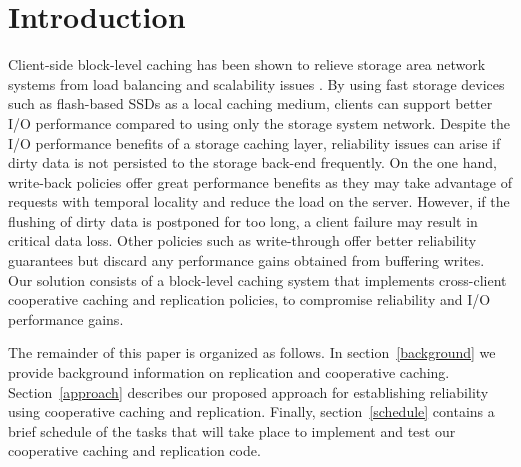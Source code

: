 \section{Introduction}

Client-side block-level caching has been shown to relieve storage
area network systems from load balancing and scalability issues
\cite{DM-Cache}\cite{visa-dm-cache}. By using fast storage devices
such as flash-based SSDs as a local caching medium, clients
can support better I/O performance compared to using only the
storage system network. Despite the I/O performance benefits of a
storage caching layer, reliability issues can arise if dirty data
is not persisted to the storage back-end frequently. On the one
hand, write-back policies offer great performance benefits as they
may take advantage of requests with temporal locality and reduce
the load on the server. However, if the flushing of dirty data is
postponed for too long, a client failure may result in critical
data loss. Other policies such as write-through offer better
reliability guarantees but discard any performance gains obtained
from buffering writes. Our solution consists of a block-level
caching system that implements cross-client cooperative caching
and replication policies, to compromise reliability and I/O
performance gains.

The remainder of this paper is organized as follows.
In section~\ref{background} we provide background information on
replication and cooperative caching. Section~\ref{approach}
describes our proposed approach for establishing reliability using
cooperative caching and replication. Finally,
section~\ref{schedule} contains a brief schedule of the tasks that
will take place to implement and test our cooperative caching and
replication code. 

\label{intro}
